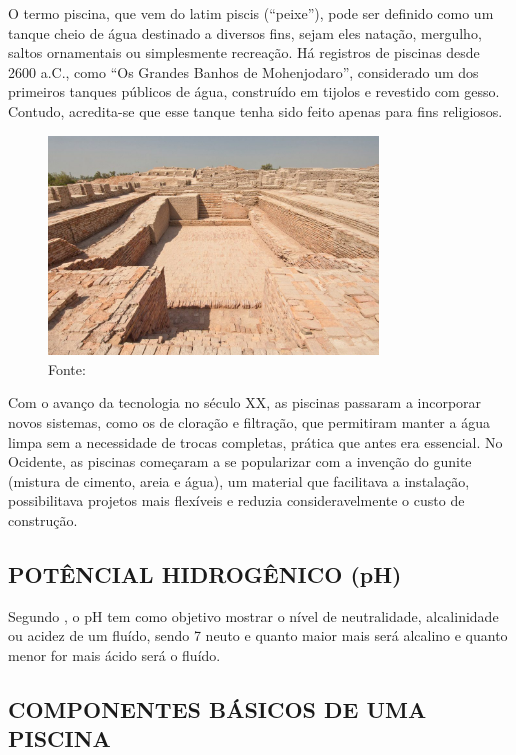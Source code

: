         O termo piscina, que vem do latim piscis (“peixe”), pode ser definido como um tanque cheio de água destinado a diversos fins, sejam eles natação, mergulho, saltos ornamentais ou simplesmente recreação\cite{piscinaOquee}. Há registros de piscinas desde 2600 a.C., como “Os Grandes Banhos de Mohenjodaro”, considerado um dos primeiros tanques públicos de água, construído em tijolos e revestido com gesso. Contudo, acredita-se que esse tanque tenha sido feito apenas para fins religiosos.
         \begin{figure}[H]
         	\centering
         	\caption{ }  
        	\centering
         	\label{fig:cont}
        	\includegraphics[width=0.78\textwidth]{imagens/primeiraPiscina.png}
        	\caption*{Fonte: \cite{piscinaHistoria}}
         \end{figure}
        
        Com o avanço da tecnologia no século XX, as piscinas passaram a incorporar novos sistemas, como os de cloração e filtração, que permitiram manter a água limpa sem a necessidade de trocas completas, prática que antes era essencial. No Ocidente, as piscinas começaram a se popularizar com a invenção do gunite (mistura de cimento, areia e água), um material que facilitava a instalação, possibilitava projetos mais flexíveis e reduzia consideravelmente o custo de construção\cite{piscinaHistoria}.

    \subsection{POTÊNCIAL HIDROGÊNICO (pH)}
        Segundo \cite{leite2020plataforma}, o pH tem como objetivo mostrar o nível de neutralidade, alcalinidade ou acidez de um fluído, sendo 7 neuto e quanto maior mais será alcalino e quanto menor for mais ácido será o fluído.

    \subsection{COMPONENTES BÁSICOS DE UMA PISCINA}
        
